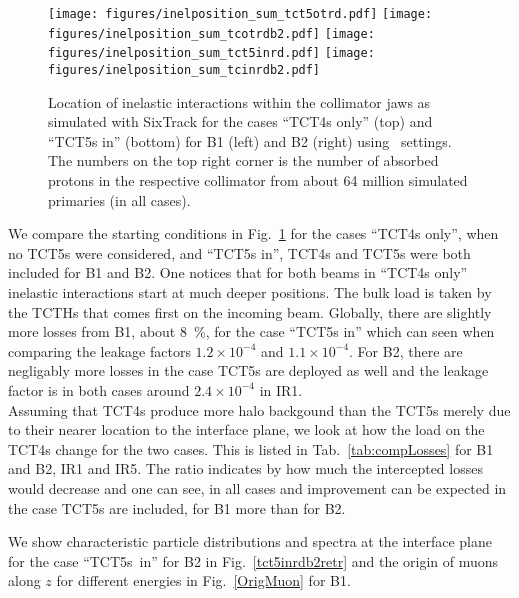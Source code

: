 \begin{figure}%
\begin{center}
\texttt{[image: figures/inelposition\_sum\_tct5otrd.pdf]}
\texttt{[image: figures/inelposition\_sum\_tcotrdb2.pdf]}
\texttt{[image: figures/inelposition\_sum\_tct5inrd.pdf]}
\texttt{[image: figures/inelposition\_sum\_tcinrdb2.pdf]}
\end{center}
\vspace{-0.6cm}
 \caption{Location of inelastic interactions within the collimator jaws as simulated with SixTrack for the cases ``TCT4s only'' (top) and ``TCT5s in'' (bottom) for B1 (left) and B2 (right) using \twosigmaret~settings. The numbers on the top right corner is the number of absorbed protons in the respective collimator from about 64 million simulated primaries (in all cases).
  \label{inelHLtctsInOut}}
\end{figure}

We compare the starting conditions in Fig.~\ref{inelHLtctsInOut} for the cases ``TCT4s only'', when no TCT5s were considered, and ``TCT5s in'', TCT4s and TCT5s were both included for B1 and B2. One notices that for both beams in ``TCT4s only'' inelastic interactions start at much deeper positions. The bulk load is taken by the TCTHs that comes first on the incoming beam. Globally, there are slightly more losses from B1, about 8~\%, for the case ``TCT5s in'' which can seen when comparing the leakage factors $1.2 \times 10^{-4}$ and $1.1 \times 10^{-4}$. For B2, there are negligably more losses in the case TCT5s are deployed as well and the leakage factor is in both cases around $2.4 \times 10^{-4}$ in IR1.\\

Assuming that TCT4s produce more halo backgound than the TCT5s merely due to their nearer location to the interface plane, we look at how the load on the TCT4s change for the two cases. This is listed in Tab.~\ref{tab:compLosses} for B1 and B2, IR1 and IR5. The ratio indicates by how much the intercepted losses would decrease and one can see, in all cases and improvement can be expected in the case TCT5s are included, for B1 more than for B2.


We show characteristic particle distributions and spectra at the interface plane for the case ``TCT5s~in'' for B2 in Fig.~\ref{tct5inrdb2retr} and the origin of muons along $z$ for different energies in Fig.~\ref{OrigMuon} for B1. \\

